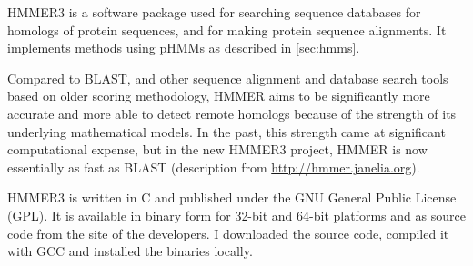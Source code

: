 HMMER3  \citep{eddy2011} is a software package used for searching sequence
databases for homologs of protein sequences, and for making protein sequence
alignments. It implements methods using pHMMs as described in
\autoref{sec:hmms}.

Compared to BLAST, and other sequence alignment and database search tools based
on older scoring methodology, HMMER aims to be significantly more accurate and
more able to detect remote homologs because of the strength of its underlying
mathematical models. In the past, this strength came at significant
computational expense, but in the new HMMER3 project, HMMER is now essentially
as fast as BLAST (description from \url{http://hmmer.janelia.org}).

HMMER3 is written in C and published under the GNU General Public License (GPL).
It is available in binary form for 32-bit and 64-bit platforms and as source
code from the site of the developers. I downloaded the source code, compiled it
with GCC and installed the binaries locally. 
